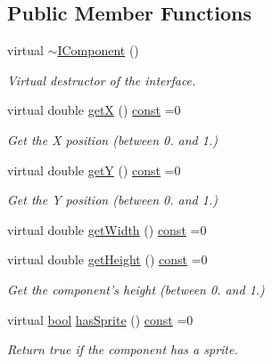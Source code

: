 \subsection*{Public Member Functions}
\begin{DoxyCompactItemize}
\item 
virtual \hyperlink{classarcade_1_1_i_component_a1d4ec4990f66b23a90c4da6b00b3a32f}{$\sim$\-I\-Component} ()
\begin{DoxyCompactList}\small\item\em Virtual destructor of the interface. \end{DoxyCompactList}\item 
virtual double \hyperlink{classarcade_1_1_i_component_ab9d24992e8519756d56c0282001eccce}{get\-X} () \hyperlink{term__entry_8h_a57bd63ce7f9a353488880e3de6692d5a}{const} =0
\begin{DoxyCompactList}\small\item\em Get the X position (between 0. and 1.) \end{DoxyCompactList}\item 
virtual double \hyperlink{classarcade_1_1_i_component_ad19f185c30ab99ed831d2c68fabf920f}{get\-Y} () \hyperlink{term__entry_8h_a57bd63ce7f9a353488880e3de6692d5a}{const} =0
\begin{DoxyCompactList}\small\item\em Get the Y position (between 0. and 1.) \end{DoxyCompactList}\item 
virtual double \hyperlink{classarcade_1_1_i_component_a558e5d49736a3828753a4062d5c9bfb1}{get\-Width} () \hyperlink{term__entry_8h_a57bd63ce7f9a353488880e3de6692d5a}{const} =0
\item 
virtual double \hyperlink{classarcade_1_1_i_component_a77a3bed39227f11d06bb71e06ee2ee30}{get\-Height} () \hyperlink{term__entry_8h_a57bd63ce7f9a353488880e3de6692d5a}{const} =0
\begin{DoxyCompactList}\small\item\em Get the component's height (between 0. and 1.) \end{DoxyCompactList}\item 
virtual \hyperlink{term__entry_8h_a002004ba5d663f149f6c38064926abac}{bool} \hyperlink{classarcade_1_1_i_component_a03ea8019a23fd44731a06548ef7e6ff3}{has\-Sprite} () \hyperlink{term__entry_8h_a57bd63ce7f9a353488880e3de6692d5a}{const} =0
\begin{DoxyCompactList}\small\item\em Return true if the component has a sprite. \end{DoxyCompactList}\item 

\end{DoxyCompactItemize}
